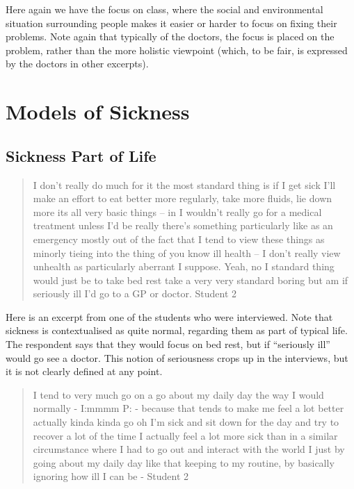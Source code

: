 Here again we have the focus on class, where the social and environmental situation surrounding people makes it easier or harder to focus on fixing their problems. Note again that typically of the doctors, the focus is placed on the problem, rather than the more holistic viewpoint (which, to be fair, is expressed by the doctors in other excerpts). 


\section{Models of Sickness}
\label{sec:models-sickness}



\subsection{Sickness Part of Life}
\label{sec:sickness-part-life}

\begin{quotation}
  I don't really do much for it the most standard thing is if I get sick I'll make an effort to eat better more regularly, take more fluids, lie down more its all very basic things – in I wouldn't really go for a medical treatment unless I'd be really there's something particularly like as an emergency mostly out of the fact that I tend to view these things as minorly tieing into the thing of you know ill health – I don't really view unhealth as particularly aberrant I suppose. Yeah, no I standard thing would just be to take bed rest take a very very standard boring but am if seriously ill I'd go to a GP or doctor.
Student 2
\end{quotation}

Here is an excerpt from one of the students who were interviewed. Note that sickness is contextualised as quite normal, regarding them as part of typical life. The respondent says that they would focus on bed rest, but if ``seriously ill'' would go see a doctor. This notion of seriousness crops up in the interviews, but it is not clearly defined at any point. 

\begin{quotation}
  I tend to very much go on a go about my daily day the way I would normally -
I:mmmm
P: - because that tends to make me feel a lot better actually kinda kinda go oh I'm sick and sit down for the day and try to recover a lot of the time I actually feel a lot more sick than in a similar circumstance where I had to go out and interact with the world I just by going about my daily day like that keeping to my routine, by basically ignoring how ill I can be -
Student 2
\end{quotation}

